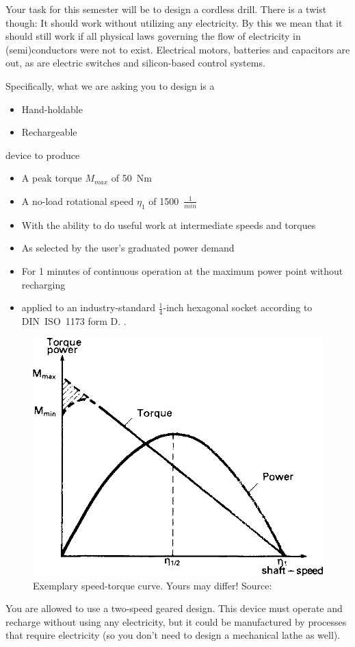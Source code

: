 \documentclass[headinclude=true]{scrartcl}
\begin{document}
Your task for this semester will be to design a cordless drill. There is a twist though: It should work without utilizing any electricity. By this we mean that it should still work if all physical laws governing the flow of electricity in (semi)conductors were not to exist. Electrical motors, batteries and capacitors are out, as are electric switches and silicon-based control systems.

Specifically, what we are asking you to design is a

\begin{itemize}
 \item Hand-holdable
 \item Rechargeable
\end{itemize}

device to produce

\begin{itemize}
 \item A peak torque $M_{max}$ of 50~Nm
 \item A no-load rotational speed $\eta_1$ of 1500~$\frac{1}{min}$
 \item With the ability to do useful work at intermediate speeds and torques
 \item As selected by the user's graduated power demand
 \item For 1 minutes of continuous operation at the maximum power point without recharging
 \item applied to an industry-standard $\frac{1}{4}$-inch hexagonal socket according to DIN~ISO~1173 form D. \cite{DDIN2009}.
\end{itemize}

\begin{figure} \centering
 \includegraphics[width=0.5\linewidth]{speed-torque}
 \caption{Exemplary speed-torque curve. Yours may differ! Source: \cite{Barber1997}}
\end{figure}


You are allowed to use a two-speed geared design. This device must operate and recharge without using any electricity, but it could be manufactured by processes that require electricity (so you don't need to design a mechanical lathe as well).
\end{document}
